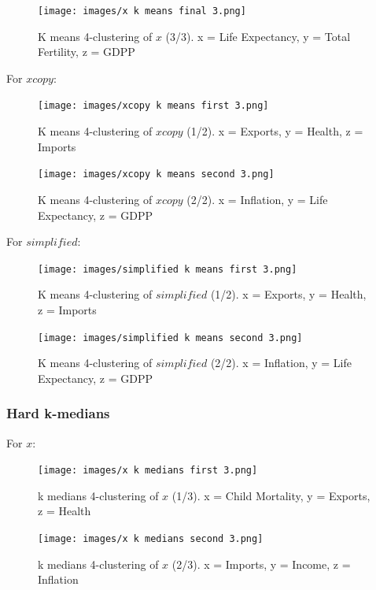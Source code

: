 \documentclass[12pt, a4paper]{article}
\begin{document}
\begin{figure}[H]
    \centering
    \texttt{[image: images/x k means final 3.png]}
    \caption{K means 4-clustering of $x$ (3/3). x = Life Expectancy, y = Total Fertility, z = GDPP}
    \label{fig:ncopy-optimal}
\end{figure}

For $xcopy$:

\begin{figure}[H]
    \centering
    \texttt{[image: images/xcopy k means first 3.png]}
    \caption{K means 4-clustering of $xcopy$ (1/2). x = Exports, y = Health, z = Imports}
    \label{fig:ncopy-optimal}
\end{figure}

\begin{figure}[H]
    \centering
    \texttt{[image: images/xcopy k means second 3.png]}
    \caption{K means 4-clustering of $xcopy$ (2/2). x = Inflation, y = Life Expectancy, z = GDPP}
    \label{fig:ncopy-optimal}
\end{figure}

For $simplified$:

\begin{figure}[H]
    \centering
    \texttt{[image: images/simplified k means first 3.png]}
    \caption{K means 4-clustering of $simplified$ (1/2). x = Exports, y = Health, z = Imports}
    \label{fig:ncopy-optimal}
\end{figure}

\begin{figure}[H]
    \centering
    \texttt{[image: images/simplified k means second 3.png]}
    \caption{K means 4-clustering of $simplified$ (2/2). x = Inflation, y = Life Expectancy, z = GDPP}
    \label{fig:ncopy-optimal}
\end{figure}

\subsubsection{Hard k-medians}

For $x$:

\begin{figure}[H]
    \centering
    \texttt{[image: images/x k medians first 3.png]}
    \caption{k medians 4-clustering of $x$ (1/3). x = Child Mortality, y = Exports, z = Health}
    \label{fig:ncopy-optimal}
\end{figure}

\begin{figure}[H]
    \centering
    \texttt{[image: images/x k medians second 3.png]}
    \caption{k medians 4-clustering of $x$ (2/3). x = Imports, y = Income, z = Inflation}
    \label{fig:ncopy-optimal}
\end{figure}
\end{document}
